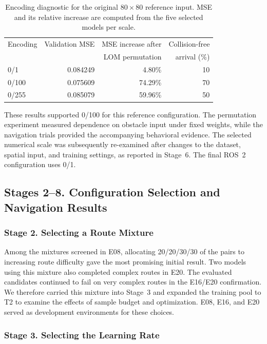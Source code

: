 \documentclass[robotics,article,submit,pdftex,moreauthors]{Definitions/mdpi}
\begin{document}
\begin{table}[htbp]
\color{red}
\centering
\caption{Encoding diagnostic for the original $80\times80$ reference input. MSE and its relative increase are computed from the five selected models per scale.}
\label{tab:reference_encoding}
\small
\begin{tabular}{lrrr}
\toprule
Encoding & Validation MSE & MSE increase after & Collision-free \\
         &                & LOM permutation & arrival (\%) \\
\midrule
0/1 & 0.084249 & 4.80\% & 10 \\
0/100 & 0.075609 & 74.29\% & 70 \\
0/255 & 0.085079 & 59.96\% & 50 \\
\bottomrule
\end{tabular}
\end{table}

These results supported 0/100 for this reference configuration. The permutation experiment measured dependence on obstacle input under fixed weights, while the navigation trials provided the accompanying behavioral evidence. The selected numerical scale was subsequently re-examined after changes to the dataset, spatial input, and training settings, as reported in Stage~6. The final ROS~2 configuration uses 0/1.
\endgroup

\begingroup
\color{red}
\subsection{Stages 2--8. Configuration Selection and Navigation Results}\label{subsec:ros2_results}

\subsubsection{Stage 2. Selecting a Route Mixture}\label{subsec:stage2_results}

Among the mixtures screened in E08, allocating 20/20/30/30 of the pairs to increasing route difficulty gave the most promising initial result. Two models using this mixture also completed complex routes in E20. The evaluated candidates continued to fail on very complex routes in the E16/E20 confirmation. We therefore carried this mixture into Stage~3 and expanded the training pool to T2 to examine the effects of sample budget and optimization. E08, E16, and E20 served as development environments for these choices.

\subsubsection{Stage 3. Selecting the Learning Rate}\label{subsec:stage3_results}
\end{document}
